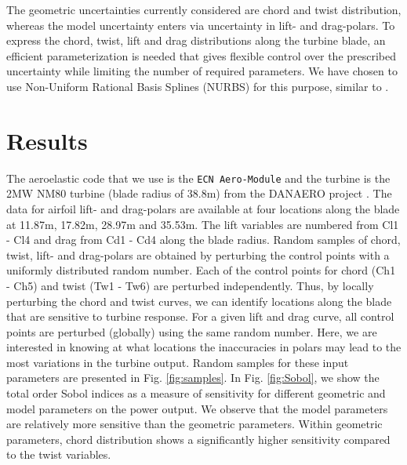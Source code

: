 \documentclass[11pt]{article}
\begin{document}
The geometric uncertainties currently considered are chord and twist distribution, whereas the model uncertainty enters via uncertainty in lift- and drag-polars. To express the chord, twist, lift and drag distributions along the turbine blade, an efficient parameterization is needed that gives flexible control over the prescribed uncertainty while limiting the number of required parameters. We have chosen to use Non-Uniform Rational Basis Splines (NURBS) for this purpose, similar to \cite{Echeverria2017}. 

\section{Results}
The aeroelastic code that we use is the \texttt{ECN Aero-Module} \cite{Boorsma2012} and the turbine is the 2MW NM80 turbine (blade radius of 38.8m) from the DANAERO project \cite{Troldborg2013}. The data for airfoil lift- and drag-polars are available at four locations along the blade at 11.87m, 17.82m, 28.97m and 35.53m. %
The lift variables are numbered from Cl1 - Cl4 and drag from Cd1 - Cd4 along the blade radius. Random samples of chord, twist, lift- and drag-polars are obtained by perturbing the control points with a uniformly distributed random number.  Each of the control points for chord (Ch1 - Ch5) and twist (Tw1 - Tw6)  are perturbed independently. Thus, by locally perturbing the chord and twist curves, we can identify locations along the blade that are sensitive to turbine response. For a given lift and drag curve, all control points are perturbed (globally) using the same random number. Here, we are interested in knowing at what locations the inaccuracies in polars may lead to the most variations in the turbine output. Random samples for these input parameters are presented in Fig. \ref{fig:samples}. In Fig. \ref{fig:Sobol}, we show the total order Sobol indices as a measure of sensitivity for different geometric and model parameters on the power output. We observe that the model parameters are relatively more sensitive than the geometric parameters. Within geometric parameters, chord distribution shows a significantly higher sensitivity compared to the twist variables.
\end{document}
